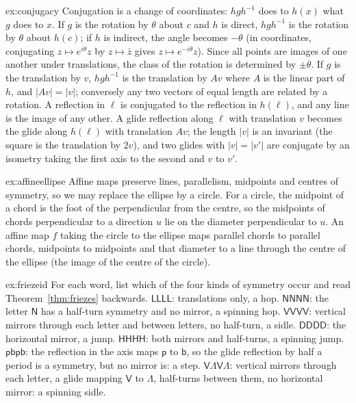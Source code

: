 \begin{solution}{ex:conjugacy}
\idea Conjugation is a change of coordinates: $hgh^{-1}$ does to $h(x)$ what $g$ does to $x$.
\writeup If $g$ is the rotation by $\theta$ about $c$ and $h$ is direct, $hgh^{-1}$ is the rotation by $\theta$ about $h(c)$; if $h$ is indirect, the
angle becomes $-\theta$ (in coordinates, conjugating $z\mapsto e^{i\theta}z$ by $z\mapsto\bar z$ gives $z\mapsto e^{-i\theta}z$). Since all points are images of one another under translations, the class of the rotation is determined by $\pm\theta$. If
$g$ is the translation by $v$, $hgh^{-1}$ is the translation by $Av$ where $A$ is the linear part of $h$, and $|Av|=|v|$; conversely any two
vectors of equal length are related by a rotation. A reflection in $\ell$ is conjugated to the reflection in $h(\ell)$, and any line is the
image of any other. A glide reflection along $\ell$ with translation $v$ becomes the glide along $h(\ell)$ with translation $Av$; the length
$|v|$ is an invariant (the square is the translation by $2v$), and two glides with $|v|=|v'|$ are conjugate by an isometry taking the first
axis to the second and $v$ to $v'$.
\end{solution}

\begin{solution}{ex:affineellipse}
\idea Affine maps preserve lines, parallelism, midpoints and centres of symmetry, so we may replace the ellipse by a circle.
\writeup For a circle, the midpoint of a chord is the foot of the perpendicular from the centre, so the midpoints of chords perpendicular to a
direction $u$ lie on the diameter perpendicular to $u$. An affine map $f$ taking the circle to the ellipse maps parallel chords to parallel
chords, midpoints to midpoints and that diameter to a line through the centre of the ellipse (the image of the centre of the circle).
\end{solution}

\begin{solution}{ex:friezeid}
\idea For each word, list which of the four kinds of symmetry occur and read Theorem~\ref{thm:friezes} backwards.
\writeup $\mathsf{LLLL}$: translations only, a hop. $\mathsf{NNNN}$: the letter $\mathsf N$ has a half-turn symmetry and no mirror, a spinning hop.
$\mathsf{VVVV}$: vertical mirrors through each letter and between letters, no half-turn, a sidle. $\mathsf{DDDD}$: the horizontal mirror, a
jump. $\mathsf{HHHH}$: both mirrors and half-turns, a spinning jump. $\mathsf{pbpb}$: the reflection in the axis maps $\mathsf p$ to $\mathsf b$, so
the glide reflection by half a period is a symmetry, but no mirror is: a step. $\mathsf{V\Lambda V\Lambda}$: vertical mirrors through each
letter, a glide mapping $\mathsf V$ to $\Lambda$, half-turns between them, no horizontal mirror: a spinning sidle.
\end{solution}

